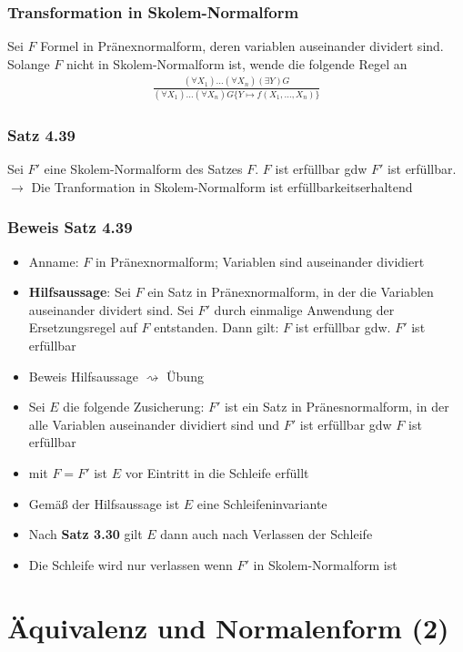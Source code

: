 \subsubsection{Transformation in Skolem-Normalform}
Sei \(F\) Formel in Pränexnormalform, deren variablen auseinander dividert sind. Solange \(F\) nicht in Skolem-Normalform ist, wende die folgende Regel an
\begin{align*}
\frac{(\forall X_1) \ldots (\forall X_n)(\exists Y)G}{(\forall X_1)\ldots (\forall X_n)G \{Y\mapsto f(X_1 ,\ldots , X_n)\} }
\end{align*}
\subsubsection{Satz 4.39}
Sei \(F'\) eine Skolem-Normalform des Satzes \(F\). \(F\) ist erfüllbar gdw  \(F'\) ist erfüllbar.\\ \(\to\) Die Tranformation in Skolem-Normalform ist erfüllbarkeitserhaltend
\subsubsection{Beweis Satz 4.39}
\begin{itemize}
	\item Anname: \(F\) in Pränexnormalform; Variablen sind auseinander dividiert
	\item \textbf{Hilfsaussage}: Sei \(F\) ein Satz in Pränexnormalform, in der die Variablen auseinander dividert sind. Sei \(F'\) durch einmalige Anwendung der Ersetzungsregel auf \(F\) entstanden. Dann gilt: \(F\) ist erfüllbar gdw. \(F'\) ist erfüllbar
	\item Beweis Hilfsaussage \(\rightsquigarrow\) Übung
	\item Sei \(E\) die folgende Zusicherung: \(F'\) ist ein Satz in Pränesnormalform, in der alle Variablen auseinander dividiert sind und \(F'\) ist erfüllbar gdw \(F\) ist erfüllbar
	\item mit \(F = F'\) ist \(E\) vor Eintritt in die Schleife erfüllt
	\item Gemäß der Hilfsaussage ist \(E\) eine Schleifeninvariante
	\item Nach \textbf{Satz 3.30} gilt \(E\) dann auch nach Verlassen der Schleife
	\item Die Schleife wird nur verlassen wenn \(F'\) in Skolem-Normalform ist
\end{itemize}
\section{Äquivalenz und Normalenform (2)}
